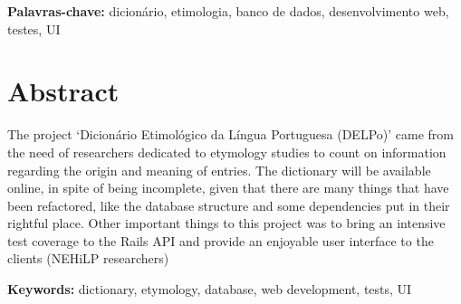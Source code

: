 \documentclass[12pt,twoside,a4paper,openany]{book}
\renewcommand{\chaptermark}[1]{\markboth{\MakeUppercase{#1}}{}}
\begin{document}
    \noindent \textbf{Palavras-chave:} dicionário, etimologia, banco de dados,
    desenvolvimento web, testes, UI

    \chapter*{Abstract}


    The project `Dicionário Etimológico da Língua Portuguesa (DELPo)' came from the need
    of researchers dedicated to etymology studies to count on information regarding the origin
    and meaning of entries.
    The dictionary will be available online, in spite of being incomplete, given that there are
    many things that have been refactored, like the database structure and some dependencies put
    in their rightful place.
    Other important things to this project was to bring an intensive test coverage to the Rails
    API and provide an enjoyable user interface to the clients (NEHiLP researchers)

    \noindent \textbf{Keywords:} dictionary, etymology, database, web development, tests, UI



    \dominitoc %
    \tableofcontents    %



    \dominilof \listoffigures \mtcaddchapter



    \mainmatter

    \fancyhead[RE,LO]{\thesection}

    \singlespacing              %


    
    
    
    
    

    \renewcommand{\chaptermark}[1]{\markboth{\MakeUppercase{\appendixname\ \thechapter}} {\MakeUppercase{#1}}}
    \fancyhead[RE,LO]{}
    \appendix
\end{document}
